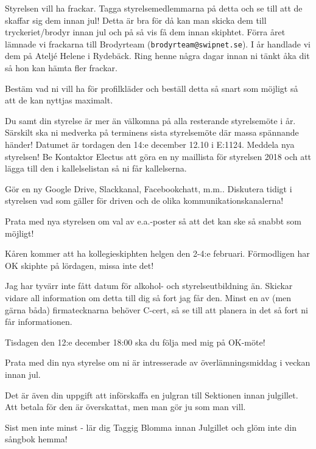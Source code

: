 \documentclass[10pt]{article}
\begin{document}
\begin{numplist}
\item Styrelsen vill ha frackar. Tagga styrelsemedlemmarna på detta och se till att de skaffar sig dem innan jul! Detta är bra för då kan man skicka dem till tryckeriet/brodyr innan jul och på så vis få dem innan skiphtet. Förra året lämnade vi frackarna till Brodyrteam (\texttt{brodyrteam@swipnet.se}). I år handlade vi dem på Ateljé Helene i Rydebäck. Ring henne några dagar innan ni tänkt åka dit så hon kan hämta fler frackar.

\item Bestäm vad ni vill ha för profilkläder och beställ detta så snart som möjligt så att de kan nyttjas maximalt.

\item Du samt din styrelse är mer än välkomna på alla resterande styrelsemöte i år. Särskilt ska ni medverka på terminens sista styrelsemöte där massa spännande händer! Datumet är tordagen den 14:e december 12.10 i E:1124. Meddela nya styrelsen! Be Kontaktor Electus att göra en ny maillista för styrelsen 2018 och att lägga till den i kallelselistan så ni får kallelserna.

\item Gör en ny Google Drive, Slackkanal, Facebookchatt, m.m.. Diskutera tidigt i styrelsen vad som gäller för driven och de olika kommunikationskanalerna!

\item Prata med nya styrelsen om val av e.a.-poster så att det kan ske så snabbt som möjligt!

\item Kåren kommer att ha kollegieskiphten helgen den 2-4:e februari. Förmodligen har OK skiphte på lördagen, missa inte det!

\item Jag har tyvärr inte fått datum för alkohol- och styrelseutbildning än. Skickar vidare all information om detta till dig så fort jag får den. Minst en av (men gärna båda) firmatecknarna behöver C-cert, så se till att planera in det så fort ni får informationen.

\item Tisdagen den 12:e december 18:00 ska du följa med mig på OK-möte!

\item Prata med din nya styrelse om ni är intresserade av överlämningsmiddag i veckan innan jul.

\item Det är även din uppgift att införskaffa en julgran till Sektionen innan julgillet. Att betala för den är överskattat, men man gör ju som man vill.

\item Sist men inte minst - lär dig Taggig Blomma innan Julgillet och glöm inte din sångbok hemma!

\end{numplist}
\end{document}
